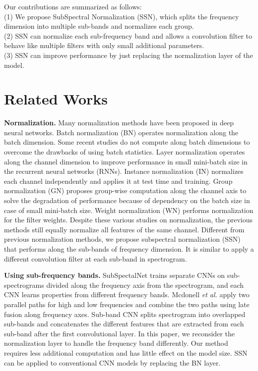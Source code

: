 \documentclass{article}
\begin{document}
Our contributions are summarized as follows:\\
(1) We propose SubSpectral Normalization (SSN), which splits the frequency dimension into multiple sub-bands and normalizes each group. \\
(2) SSN can normalize each sub-frequency band and allows a convolution filter to behave like multiple filters with only small additional parameters. \\
(3) SSN can improve performance by just replacing the normalization layer of the model.

\section{Related Works}
\label{sec:related}
\textbf{Normalization.} 
Many normalization methods have been proposed in deep neural networks. Batch normalization (BN) \cite{ioffe2015batch} operates normalization along the batch dimension. 
Some recent studies do not compute along batch dimensions to overcome the drawbacks of using batch statistics.
Layer normalization \cite{ba2016layer} operates along the channel dimension to improve performance in small mini-batch size in the recurrent neural networks (RNNs). Instance normalization (IN) \cite{ulyanov2016instance} normalizes each channel independently and applies it at test time and training. Group normalization (GN) \cite{wu2018group} proposes group-wise computation along the channel axis to solve the degradation of performance because of dependency on the batch size in case of small mini-batch size. Weight normalization (WN) \cite{salimans2016weight} performs normalization for the filter weights.
Despite these various studies on normalization, the previous methods still equally normalize all features of the same channel.
Different from previous normalization methods, we propose subspectral normalization (SSN) that performs along the sub-bands of frequency dimension. It is similar to apply a different convolution filter at each sub-band in spectrogram.

\noindent\textbf{Using sub-frequency bands.}
SubSpectalNet \cite{phaye2019subspectralnet} trains separate CNNs on sub-spectrograms divided along the frequency axis from the spectrogram, and each CNN learns properties from different frequency bands. Mcdonell \textit{et al.} \cite{mcdonnell2020acoustic} apply two parallel paths for high and low frequencies and combine the two paths using late fusion along frequency axes. Sub-band CNN  \cite{kao2019sub} splits spectrogram into overlapped sub-bands and concatenates the different features that are extracted from each sub-band after the first convolutional layer.
In this paper, we reconsider the normalization layer to handle the frequency band differently. Our method requires less additional computation and has little effect on the model size. SSN can be applied to conventional CNN models by replacing the BN layer.  
\end{document}
